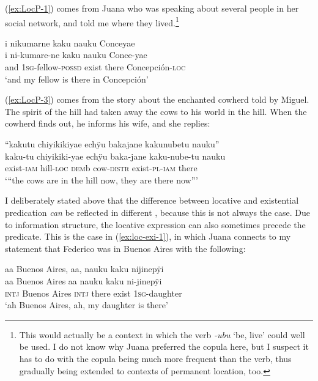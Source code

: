 (\ref{ex:LocP-1}) comes from Juana who was speaking about several people in her social network, and told me where they lived.\footnote{This would actually be a context in which the verb \textit{-ubu} ‘be, live’ could well be used. I do not know why Juana preferred the copula here, but I suspect it has to do with the copula being much more frequent than the verb, thus gradually being extended to contexts of permanent location, too.}

\ea\label{ex:LocP-1}
\begingl 
\glpreamble i nikumarne kaku nauku Conceyae\\
\gla i ni-kumare-ne kaku nauku Conce-yae\\ 
\glb and 1\textsc{sg}-fellow-\textsc{possd} exist there Concepción-\textsc{loc}\\ 
\glft ‘and my fellow is there in Concepción’
\trailingcitation{[jxx-p110923l-2.133]}
\xe

(\ref{ex:LocP-3}) comes from the story about the enchanted cowherd told by Miguel. The spirit of the hill had taken away the cows to his world in the hill. When the cowherd finds out, he informs his wife, and she replies:

\ea\label{ex:LocP-3}
\begingl
\glpreamble “kakutu chiyikikiyae echÿu bakajane kakunubetu nauku”\\
\gla kaku-tu chiyikiki-yae echÿu baka-jane kaku-nube-tu nauku\\
\glb exist-\textsc{iam} hill-\textsc{loc} \textsc{dem}b cow-\textsc{distr} exist-\textsc{pl}-\textsc{iam} there\\
\glft ‘“the cows are in the hill now, they are there now”’
\endgl
\trailingcitation{[mxx-n151017l-1.64]}
\xe

I deliberately stated above that the difference between locative and existential predication \textit{can} be reflected in different , because this is not always the case. Due to information structure, the locative expression can also sometimes precede the predicate. This is the case in (\ref{ex:loc-exi-1}), in which Juana connects to my statement that Federico was in Buenos Aires with the following:

\ea\label{ex:loc-exi-1}
\begingl
\glpreamble aa Buenos Aires, aa, nauku kaku nijinepÿi\\
\gla aa {Buenos Aires} aa nauku kaku ni-jinepÿi\\
\glb \textsc{intj} {Buenos Aires} \textsc{intj} there exist 1\textsc{sg}-daughter\\
\glft ‘ah Buenos Aires, ah, my daughter is there’
\endgl
\trailingcitation{[jxx-p110923l-1.104-107]}
\xe

